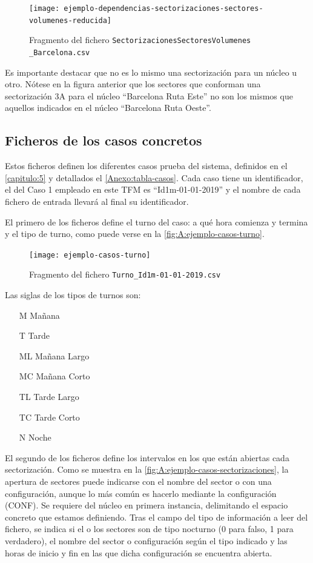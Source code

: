 \begin{figure}[h]
	\centering
	\texttt{[image: ejemplo-dependencias-sectorizaciones-sectores-volumenes-reducida]}
	\caption{Fragmento del fichero \texttt{SectorizacionesSectoresVolumenes \_Barcelona.csv}}
	\label{fig:A:ejemplo-dependencias-sectorizaciones-sectores-volumenes}
\end{figure}

Es importante destacar que no es lo mismo una sectorización para un núcleo u otro. Nótese en la figura anterior que los sectores que conforman una sectorización 3A para el núcleo ``Barcelona Ruta Este'' no son los mismos que aquellos indicados en el núcleo ``Barcelona Ruta Oeste''.

\subsection{Ficheros de los casos concretos}

Estos ficheros definen los diferentes casos prueba del sistema, definidos en el \autoref{capitulo:5} y detallados el \autoref{Anexo:tabla-casos}. Cada caso tiene un identificador, el del Caso 1 empleado en este TFM es ``Id1m-01-01-2019'' y el nombre de cada fichero de entrada llevará al final su identificador.

El primero de los ficheros define el turno del caso: a qué hora comienza y termina y el tipo de turno, como puede verse en la \autoref{fig:A:ejemplo-casos-turno}.

\begin{figure}[h]
	\centering
	\texttt{[image: ejemplo-casos-turno]}
	\caption{Fragmento del fichero \texttt{Turno\_Id1m-01-01-2019.csv}}
	\label{fig:A:ejemplo-casos-turno}
\end{figure}

Las siglas de los tipos de turnos son:

\begin{enumerate}[align=left]
	\item[M] Mañana
	\item[T] Tarde 
	\item[ML] Mañana Largo
	\item[MC] Mañana Corto
	\item[TL] Tarde Largo
	\item[TC] Tarde Corto
	\item[N] Noche
\end{enumerate}


El segundo de los ficheros define los intervalos en los que están abiertas cada sectorización. Como se muestra en la \autoref{fig:A:ejemplo-casos-sectorizaciones}, la apertura de sectores puede indicarse con el nombre del sector o con una configuración, aunque lo más común es hacerlo mediante la configuración (CONF). Se requiere del núcleo en primera instancia, delimitando el espacio concreto que estamos definiendo. Tras el campo del tipo de información a leer del fichero, se indica si el o los sectores son de tipo nocturno (0 para falso, 1 para verdadero), el nombre del sector o configuración según el tipo indicado y las horas de inicio y fin en las que dicha configuración se encuentra abierta.

